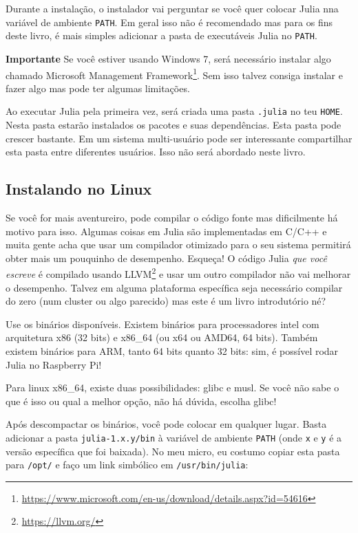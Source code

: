 \documentclass[
  notoc %
]{tufte-book}
\DeclareRobustCommand{\href}[2]{#2\footnote{\url{#1}}}
\newcommand{\passthrough}[1]{#1}
\begin{document}
Durante a instalação, o instalador vai perguntar se você quer colocar
Julia nna variável de ambiente \passthrough{\lstinline!PATH!}. Em geral
isso não é recomendado mas para os fins deste livro, é mais simples
adicionar a pasta de executáveis Julia no
\passthrough{\lstinline!PATH!}.

\textbf{Importante} Se você estiver usando Windows 7, será necessário
instalar algo chamado
\href{https://www.microsoft.com/en-us/download/details.aspx?id=54616}{Microsoft
Management Framework}. Sem isso talvez consiga instalar e fazer algo mas
pode ter algumas limitações.

Ao executar Julia pela primeira vez, será criada uma pasta
\passthrough{\lstinline!.julia!} no teu \passthrough{\lstinline!HOME!}.
Nesta pasta estarão instalados os pacotes e suas dependências. Esta
pasta pode crescer bastante. Em um sistema multi-usuário pode ser
interessante compartilhar esta pasta entre diferentes usuários. Isso não
será abordado neste livro.

\hypertarget{instalando-no-linux}{%
\subsection{Instalando no Linux}\label{instalando-no-linux}}

Se você for mais aventureiro, pode compilar o código fonte mas
dificilmente há motivo para isso. Algumas coisas em Julia são
implementadas em C/C++ e muita gente acha que usar um compilador
otimizado para o seu sistema permitirá obter mais um pouquinho de
desempenho. Esqueça! O código Julia \emph{que você escreve} é compilado
usando \href{https://llvm.org/}{LLVM} e usar um outro compilador não vai
melhorar o desempenho. Talvez em alguma plataforma específica seja
necessário compilar do zero (num cluster ou algo parecido) mas este é um
livro introdutório né?

Use os binários disponíveis. Existem binários para processadores intel
com arquitetura x86 (32 bits) e x86\_64 (ou x64 ou AMD64, 64 bits).
Também existem binários para ARM, tanto 64 bits quanto 32 bits: sim, é
possível rodar Julia no Raspberry Pi!

Para linux x86\_64, existe duas possibilidades: glibc e musl. Se você
não sabe o que é isso ou qual a melhor opção, não há dúvida, escolha
glibc!

Após descompactar os binários, você pode colocar em qualquer lugar.
Basta adicionar a pasta \passthrough{\lstinline!julia-1.x.y/bin!} à
variável de ambiente \passthrough{\lstinline!PATH!} (onde
\passthrough{\lstinline!x!} e \passthrough{\lstinline!y!} é a versão
específica que foi baixada). No meu micro, eu costumo copiar esta pasta
para \passthrough{\lstinline!/opt/!} e faço um link simbólico em
\passthrough{\lstinline!/usr/bin/julia!}:
\end{document}
